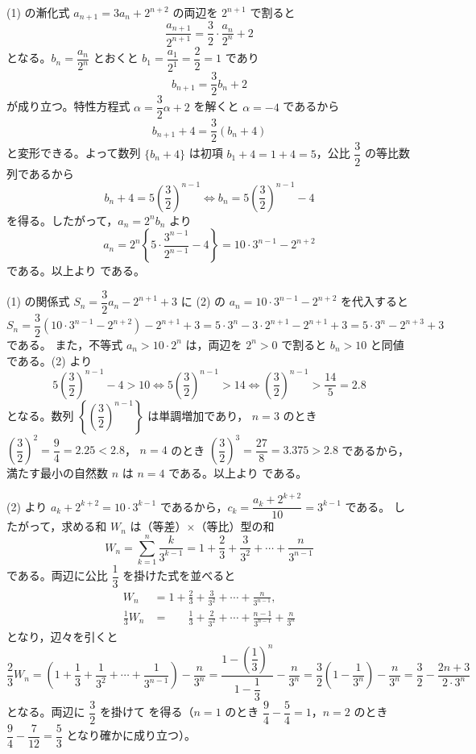 (1) の漸化式 $a_{n+1}=3a_{n}+2^{n+2}$ の両辺を $2^{n+1}$ で割ると
\[
  \frac{a_{n+1}}{2^{n+1}}=\frac{3}{2}\cdot\frac{a_{n}}{2^{n}}+2
\]
となる。$b_{n}=\dfrac{a_{n}}{2^{n}}$ とおくと $b_{1}=\dfrac{a_{1}}{2^{1}}=\dfrac{2}{2}=1$ であり
\[
  b_{n+1}=\frac{3}{2}b_{n}+2
\]
が成り立つ。特性方程式 $\alpha=\dfrac{3}{2}\alpha+2$ を解くと $\alpha=-4$ であるから
\[
  b_{n+1}+4=\frac{3}{2}(b_{n}+4)
\]
と変形できる。よって数列 $\{b_{n}+4\}$ は初項 $b_{1}+4=1+4=5$，公比 $\dfrac{3}{2}$ の等比数列であるから
\[
  b_{n}+4=5\left(\frac{3}{2}\right)^{n-1} \iff b_{n}=5\left(\frac{3}{2}\right)^{n-1}-4
\]
を得る。したがって，$a_{n}=2^{n}b_{n}$ より
\[
  a_{n}=2^{n}\left\{5\cdot\frac{3^{n-1}}{2^{n-1}}-4\right\}=10\cdot 3^{n-1}-2^{n+2}
\]
である。以上より
である。

(1) の関係式 $S_{n}=\dfrac{3}{2}a_{n}-2^{n+1}+3$ に (2) の $a_{n}=10\cdot 3^{n-1}-2^{n+2}$ を代入すると
\[
  S_{n}=\frac{3}{2}\left(10\cdot 3^{n-1}-2^{n+2}\right)-2^{n+1}+3
  =5\cdot 3^{n}-3\cdot 2^{n+1}-2^{n+1}+3
  =5\cdot 3^{n}-2^{n+3}+3
\]
である。
また，不等式 $a_{n}>10\cdot 2^{n}$ は，両辺を $2^{n}>0$ で割ると $b_{n}>10$ と同値である。(2) より
\[
  5\left(\frac{3}{2}\right)^{n-1}-4>10 \iff 5\left(\frac{3}{2}\right)^{n-1}>14 \iff \left(\frac{3}{2}\right)^{n-1}>\frac{14}{5}=2.8
\]
となる。数列 $\left\{\left(\dfrac{3}{2}\right)^{n-1}\right\}$ は単調増加であり，
$n=3$ のとき $\left(\dfrac{3}{2}\right)^{2}=\dfrac{9}{4}=2.25<2.8$，
$n=4$ のとき $\left(\dfrac{3}{2}\right)^{3}=\dfrac{27}{8}=3.375>2.8$
であるから，満たす最小の自然数 $n$ は $n=4$ である。以上より
である。

(2) より $a_{k}+2^{k+2}=10\cdot 3^{k-1}$ であるから，$c_{k}=\dfrac{a_{k}+2^{k+2}}{10}=3^{k-1}$ である。
したがって，求める和 $W_{n}$ は（等差）$\times$（等比）型の和
\[
  W_{n}=\sum_{k=1}^{n}\frac{k}{3^{k-1}}=1+\frac{2}{3}+\frac{3}{3^{2}}+\cdots+\frac{n}{3^{n-1}}
\]
である。両辺に公比 $\dfrac{1}{3}$ を掛けた式を並べると
\begin{align*}
  W_{n} &= 1+\frac{2}{3}+\frac{3}{3^{2}}+\cdots+\frac{n}{3^{n-1}}, \\
  \frac{1}{3}W_{n} &= \phantom{1+{}}\frac{1}{3}+\frac{2}{3^{2}}+\cdots+\frac{n-1}{3^{n-1}}+\frac{n}{3^{n}}
\end{align*}
となり，辺々を引くと
\[
  \frac{2}{3}W_{n}=\left(1+\frac{1}{3}+\frac{1}{3^{2}}+\cdots+\frac{1}{3^{n-1}}\right)-\frac{n}{3^{n}}
  =\frac{1-\left(\dfrac{1}{3}\right)^{n}}{1-\dfrac{1}{3}}-\frac{n}{3^{n}}
  =\frac{3}{2}\left(1-\frac{1}{3^{n}}\right)-\frac{n}{3^{n}}
  =\frac{3}{2}-\frac{2n+3}{2\cdot 3^{n}}
\]
となる。両辺に $\dfrac{3}{2}$ を掛けて
を得る（$n=1$ のとき $\dfrac{9}{4}-\dfrac{5}{4}=1$，$n=2$ のとき $\dfrac{9}{4}-\dfrac{7}{12}=\dfrac{5}{3}$ となり確かに成り立つ）。

